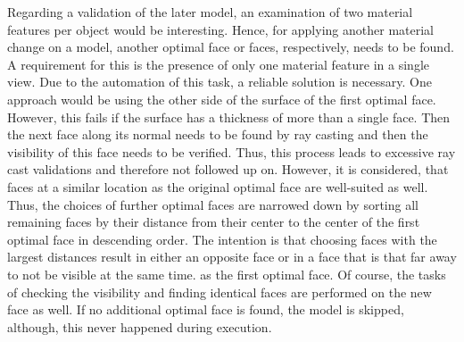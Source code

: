Regarding a validation of the later model, an examination of two material features per object would be interesting.
Hence, for applying another material change on a model, another optimal face or faces, respectively, needs to be found.
A requirement for this is the presence of only one material feature in a single view.
Due to the automation of this task, a reliable solution is necessary.
One approach would be using the other side of the surface of the first optimal face.
However, this fails if the surface has a thickness of more than a single face.
Then the next face along its normal needs to be found by ray casting and then the visibility of this face needs to be verified.
Thus, this process leads to excessive ray cast validations and therefore not followed up on.
However, it is considered, that faces at a similar location as the original optimal face are well-suited as well.
Thus, the choices of further optimal faces are narrowed down by sorting all remaining faces by their distance from their center to the center of the first optimal face in descending order.
The intention is that choosing faces with the largest distances result in either an opposite face or in a face that is that far away to not be visible at the same time. as the first optimal face.
Of course, the tasks of checking the visibility and finding identical faces are performed on the new face as well.
If no additional optimal face is found, the model is skipped, although, this never happened during execution.